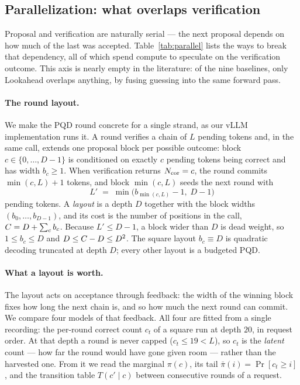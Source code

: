 \documentclass{article} %
\makeatletter
\newenvironment{ai}
  {\color{lightgray}%
   \@ifpackageloaded{caption}{\captionsetup{font={color=lightgray}}}{}%
   \let\ai@savedfloatreset\@floatboxreset
   \g@addto@macro\@floatboxreset{\color{lightgray}}}
  {\global\let\@floatboxreset\ai@savedfloatreset}
\makeatother
\begin{document}
\begin{ai}
\subsection{Parallelization: what overlaps verification}
\label{sec:parallel}

Proposal and verification are naturally serial --- the next proposal depends on
how much of the last was accepted. Table~\ref{tab:parallel} lists the ways to
break that dependency, all of which spend compute to speculate on the
verification outcome. This axis is nearly empty in the literature: of the nine
baselines, only Lookahead overlaps anything, by fusing guessing into the same
forward pass.

\begin{table}[t]
  \centering
  \caption{Parallelization schemes. ``extra compute'' is the cost multiplier
  relative to serial drafting; $\nprop$ is the number of proposed tokens and
  $\budget$ the node budget.}
  \label{tab:parallel}
  
\end{table}

\paragraph{The round layout.} We make the PQD round concrete for a single
strand, as our vLLM implementation runs it. A round verifies a chain of $L$
pending tokens and, in the same call, extends one proposal block per possible
outcome: block $c \in \{0, \dots, D-1\}$ is conditioned on exactly $c$ pending
tokens being correct and has width $b_c \geq 1$. When verification returns
$N_{\mathrm{cor}} = c$, the round commits $\min(c, L) + 1$ tokens, and block
$\min(c, L)$ seeds the next round with
\begin{equation}
  L' \;=\; \min\big(b_{\min(c, L)} - 1,\; D - 1\big)
  \label{eq:nextchain}
\end{equation}
pending tokens. A \emph{layout} is a depth $D$ together with the block widths
$(b_0, \dots, b_{D-1})$, and its cost is the number of positions in the call,
$C = D + \sum_c b_c$. Because $L' \leq D - 1$, a block wider than $D$ is
dead weight, so $1 \leq b_c \leq D$ and $D \leq C - D \leq D^2$. The square
layout $b_c \equiv D$ is quadratic decoding truncated at depth $D$; every other
layout is a budgeted PQD.

\paragraph{What a layout is worth.} The layout acts on acceptance through
feedback: the width of the winning block fixes how long the next chain is, and
so how much the next round can commit. We compare four models of that feedback.
All four are fitted from a single recording: the per-round correct count $c_t$
of a square run at depth $20$, in request order. At that depth a round is never
capped ($c_t \leq 19 < L$), so $c_t$ is the \emph{latent} count --- how far the
round would have gone given room --- rather than the harvested one. From it we
read the marginal $\pi(c)$, its tail $\bar\pi(i) = \Pr[c_t \geq i]$, and the
transition table $T(c' \mid c)$ between consecutive rounds of a request.


\end{ai}
\end{document}
